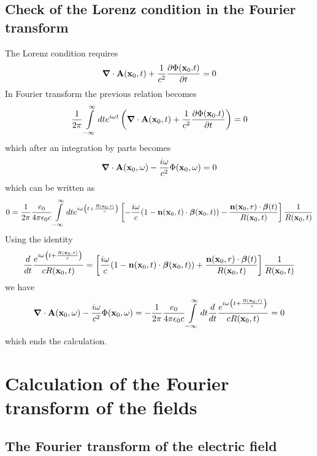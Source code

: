 \subsection{Check of the Lorenz condition in the Fourier transform}
The Lorenz condition requires
\begin{align}
    {\boldsymbol{\nabla}}\cdot{\bf A}({\bf x}_0,t)+\frac1{c^2}\frac{\partial \Phi({\bf x}_0.t)}{\partial t}=0
\end{align}
In Fourier transform the previous relation becomes
\begin{align}
    \frac1{2\pi}\int\limits_{-\infty}^{\infty}dte^{i\omega t}\left(    {\boldsymbol{\nabla}}\cdot{\bf A}({\bf x}_0,t)+\frac1{c^2}\frac{\partial \Phi({\bf x}_0.t)}{\partial t}\right)=0
\end{align}
which after an integration by parts becomes
\begin{align}
    {\boldsymbol{\nabla}}\cdot{\bf A}({\bf x}_0,\omega)-\frac{i\omega}{c^2} \Phi({\bf x}_0,\omega)=0
\end{align}
which can be written as
\begin{align}
    0=\frac1{2\pi}\frac{e_0}{4\pi\epsilon_0c}\int\limits_{-\infty}^{\infty}dte^{i\omega \left(t+\frac{R({\bf x}_0,t)}c\right)}\left[-\frac{i\omega}c(1-{\bf n}({\bf x}_0,t)\cdot{\boldsymbol{\beta}}({\bf x}_0,t))-\frac{{\bf n}({\bf x}_0,r)\cdot{\boldsymbol{\beta}}(t)}{R({\bf x}_0,t)}\right]\frac1{R({\bf x}_0,t)}
\end{align}
Using the identity
\begin{align}
    \frac{d}{dt}\frac{e^{i\omega \left(t+\frac{R({\bf x}_0,t)}c\right)}}{cR({\bf x}_0,t)}=\left[\frac{i\omega}c(1-{\bf n}({\bf x}_0,t)\cdot{\boldsymbol{\beta}}({\bf x}_0,t))+\frac{{\bf n}({\bf x}_0,r)\cdot{\boldsymbol{\beta}}(t)}{R({\bf x}_0,t)}\right]\frac1{R({\bf x}_0,t)}
\end{align}
we have
\begin{align}
    {\boldsymbol{\nabla}}\cdot{\bf A}({\bf x}_0,\omega)-\frac{i\omega}{c^2} \Phi({\bf x}_0,\omega)=-\frac1{2\pi}\frac{e_0}{4\pi\epsilon_0c}\int\limits_{-\infty}^{\infty}dt\frac{d}{dt}\frac{e^{i\omega \left(t+\frac{R({\bf x}_0,t)}c\right)}}{cR({\bf x}_0,t)}=0
\end{align}
which ends the calculation.
\section{Calculation of the Fourier transform of the fields}


\subsection{The Fourier transform of the electric field}

